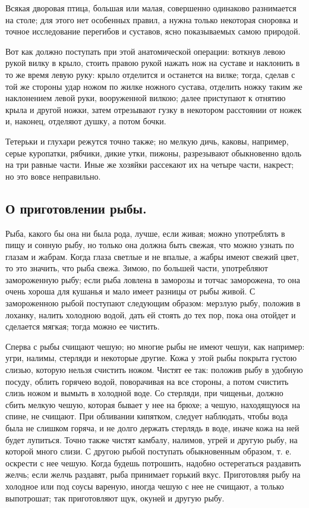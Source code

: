Всякая дворовая птица, большая или малая, совершенно одинаково разнимается на столе; для этого нет особенных правил, а нужна только некоторая сноровка и точное исследование перегибов и суставов, ясно показываемых самою природой.

Вот как должно поступать при этой анатомической операции: воткнув левою рукой вилку в крыло, стоить правою рукой нажать нож на суставе и наклонить в то же время левую руку: крыло отделится и останется на вилке; тогда, сделав с той же стороны удар ножом по жилке ножного сустава, отделить ножку таким же наклонением левой руки, вооруженной вилкою; далее приступают к отнятию крыла и другой ножки, затем отрезывают гузку в некотором расстоянии от ножек и, наконец, отделяют душку, а потом бочки.

Тетерьки и глухари режутся точно также; но мелкую дичь, каковы, например, серые куропатки, рябчики, дикие утки, пижоны, разрезывают обыкновенно вдоль на три равные части. Иные же хозяйки рассекают их на четыре части, накрест; но это вовсе неправильно.

\subsection*{О приготовлении рыбы.}

Рыба, какого бы она ни была рода, лучше, если живая; можно употреблять в пищу и сонную рыбу, но только она должна быть свежая, что можно узнать по глазам и жабрам. Когда глаза светлые и не впалые, а жабры имеют свежий цвет, то это значить, что рыба свежа. Зимою, по большей части, употребляют замороженную рыбу; если рыба ловлена в заморозы и тотчас заморожена, то она очень хороша для кушанья и мало имеет разницы от рыбы живой. С замороженною рыбой поступают следующим образом: мерзлую рыбу, положив в лоханку, налить холодною водой, дать ей стоять до тех пор, пока она отойдет и сделается мягкая; тогда можно ее чистить.

Сперва с рыбы счищают чешую; но многие рыбы не имеют чешуи, как например: угри, налимы, стерляди и некоторые другие. Кожа у этой рыбы покрыта густою слизью, которую нельзя счистить ножом. Чистят ее так: положив рыбу в удобную посуду, облить горячею водой, поворачивая на все стороны, а потом счистить слизь ножом и вымыть в холодной воде. Со стерляди, при чищеньи, должно сбить мелкую чешую, которая бывает у нее на брюхе; а чешую, находящуюся на спине, не счищают. При обливании кипятком, следует наблюдать, чтобы вода была не слишком горяча, и не долго держать стерлядь в воде, иначе кожа на ней будет лупиться. Точно также чистят камбалу, налимов, угрей и другую рыбу, на которой много слизи. С другою рыбой поступать обыкновенным образом, т. е. оскрести с нее чешую. Когда будешь потрошить, надобно остерегаться раздавить желчь; если желчь раздавят, рыба принимает горький вкус. Приготовляя рыбу на холодное или под соусы вареную, иногда чешую с нее не счищают, а только выпотрошат; так приготовляют щук, окуней и другую рыбу.

